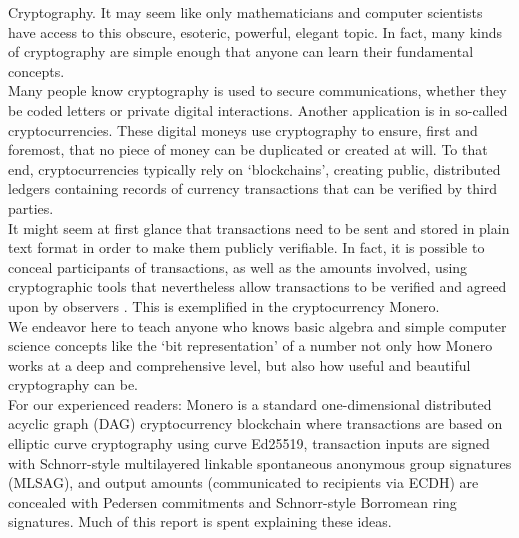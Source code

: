 

Cryptography. It may seem like only mathematicians and computer scientists have access to this obscure, esoteric, powerful, elegant topic. In fact, many kinds of cryptography are simple enough that anyone can learn their fundamental concepts.
\\ \newline
Many people know cryptography is used to secure communications, whether they be coded letters or private digital interactions. Another application is in so-called cryptocurrencies. These digital moneys use cryptography to ensure, first and foremost, that no piece of money can be duplicated or created at will. To that end, cryptocurrencies typically rely on `blockchains', creating public, distributed ledgers containing records of currency transactions that can be verified by third parties.
\\ \newline
It might seem at first glance that transactions need to be sent and stored in plain text format in order to make them publicly verifiable. In fact, it is possible to conceal participants of transactions, as well as the amounts involved, using cryptographic tools that nevertheless allow transactions to be verified and agreed upon by observers \cite{cryptoNoteWhitePaper}. This is exemplified in the cryptocurrency Monero.
\\ \newline
We endeavor here to teach anyone who knows basic algebra and simple computer science concepts like the `bit representation' of a number not only how Monero works at a deep and comprehensive level, but also how useful and beautiful cryptography can be.
\\ \newline
For our experienced readers: Monero is a standard one-dimensional distributed acyclic graph (DAG) cryptocurrency blockchain where transactions are based on elliptic curve cryptography using curve Ed25519, transaction inputs are signed with Schnorr-style multilayered linkable spontaneous anonymous group signatures (MLSAG), and output amounts (communicated to recipients via ECDH) are concealed with Pedersen commitments and Schnorr-style Borromean ring signatures. Much of this report is spent explaining these ideas.